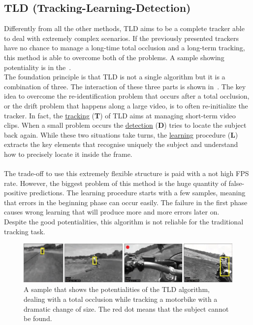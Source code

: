 \subsection{TLD (Tracking-Learning-Detection)} \label{sec:tld}
Differently from all the other methods, TLD\cite{tld} aims to be a complete tracker able to deal with extremely complex scenarios. If the previously presented trackers have no chance to manage a long-time total occlusion and a long-term tracking, this method is able to overcome both of the problems. A sample showing potentiality is in the~.\\
The foundation principle is that TLD is not a single algorithm but it is a combination of three. The interaction of these three parts is shown in~. The key idea to overcome the re-identification problem that occurs after a total occlusion, or the drift problem that happens along a large video, is to often re-initialize the tracker. In fact, the \underline{tracking} (\textbf{T}) of TLD aims at managing short-term video clips. When a small problem occurs the \underline{detection} (\textbf{D}) tries to locate the subject back again. While these two situations take turns, the \underline{learning} procedure (\textbf{L}) extracts the key elements that recognise uniquely the subject and understand how to precisely locate it inside the frame.\\
\\
The trade-off to use this extremely flexible structure is paid with a not high FPS rate. However, the biggest problem of this method is the huge quantity of false-positive predictions. The learning procedure starts with a few samples, meaning that errors in the beginning phase can occur easily. The failure in the first phase causes wrong learning that will produce more and more errors later on.\\
Despite the good potentialities, this algorithm is not reliable for the traditional tracking task.
\begin{figure}[!h]
	\centering
	\includegraphics[width=1\linewidth]{images/tracking/sample_TLD}
	\captionsetup{margin=0.5cm}
	\caption[TLD algorithm applied on a total occlusion video clip.]{A sample that shows the potentialities of the TLD algorithm, dealing with a total occlusion while tracking a motorbike with a dramatic change of size. The red dot means that the subject cannot be found.}
	\label{fig:sample_TLD}
\end{figure}




